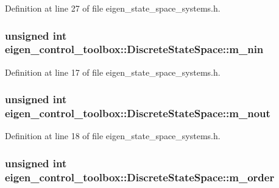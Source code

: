 Definition at line 27 of file eigen\+\_\+state\+\_\+space\+\_\+systems.\+h.

\subsubsection[{\texorpdfstring{m\+\_\+nin}{m_nin}}]{\setlength{\rightskip}{0pt plus 5cm}unsigned int eigen\+\_\+control\+\_\+toolbox\+::\+Discrete\+State\+Space\+::m\+\_\+nin\hspace{0.3cm}{\ttfamily [protected]}}\hypertarget{classeigen__control__toolbox_1_1_discrete_state_space_a28d1ee83fe68a634516e4bcf53990954}{}\label{classeigen__control__toolbox_1_1_discrete_state_space_a28d1ee83fe68a634516e4bcf53990954}


Definition at line 17 of file eigen\+\_\+state\+\_\+space\+\_\+systems.\+h.

\subsubsection[{\texorpdfstring{m\+\_\+nout}{m_nout}}]{\setlength{\rightskip}{0pt plus 5cm}unsigned int eigen\+\_\+control\+\_\+toolbox\+::\+Discrete\+State\+Space\+::m\+\_\+nout\hspace{0.3cm}{\ttfamily [protected]}}\hypertarget{classeigen__control__toolbox_1_1_discrete_state_space_a709da4473200de4bfff97932bf3efd64}{}\label{classeigen__control__toolbox_1_1_discrete_state_space_a709da4473200de4bfff97932bf3efd64}


Definition at line 18 of file eigen\+\_\+state\+\_\+space\+\_\+systems.\+h.

\subsubsection[{\texorpdfstring{m\+\_\+order}{m_order}}]{\setlength{\rightskip}{0pt plus 5cm}unsigned int eigen\+\_\+control\+\_\+toolbox\+::\+Discrete\+State\+Space\+::m\+\_\+order\hspace{0.3cm}{\ttfamily [protected]}}\hypertarget{classeigen__control__toolbox_1_1_discrete_state_space_af226df79174f11922017e18ebb45e89b}{}\label{classeigen__control__toolbox_1_1_discrete_state_space_af226df79174f11922017e18ebb45e89b}


